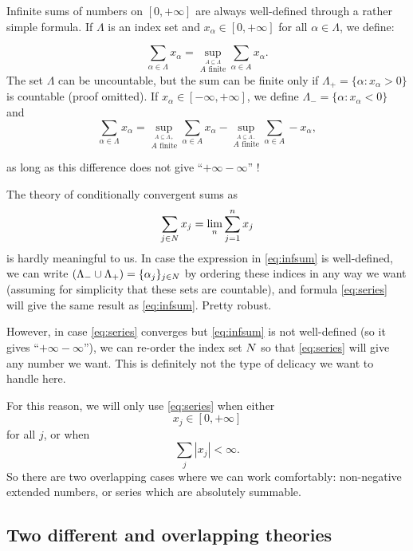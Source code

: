 \documentclass[
]{book}
\let\mathbb\relax %
\newcommand{\N}{\mathbb{N}}
\theoremstyle{definition}
\theoremstyle{definition}
\theoremstyle{definition}
\theoremstyle{definition}
\theoremstyle{remark}
\begin{document}
Infinite sums of numbers on \([0,+\infty]\) are always well-defined
through a rather simple formula. If \(\Lambda\) is an index set and
\(x_\alpha \in [0,+\infty]\) for all \(\alpha \in \Lambda\), we define:

\[\nonumber
\sum_{\alpha \in \Lambda} x_\alpha = \sup_{\stackrel{A \subseteq \Lambda}{A \text{ finite}}} \sum_{\alpha \in A} x_\alpha
.\] The set \(\Lambda\) can be uncountable, but the sum can be finite only
if \(\Lambda_+ = \{\alpha:x_\alpha>0\}\) is countable (proof omitted). If
\(x_\alpha \in [-\infty,+\infty]\), we define
\(\Lambda_- = \{\alpha:x_\alpha<0\}\) and
\begin{equation}
\label{eq:infsum}
\sum_{\alpha \in \Lambda} x_\alpha =
\sup_{\stackrel{A \subseteq \Lambda_+}{A \text{ finite}}} \sum_{\alpha \in A} x_\alpha
-
\sup_{\stackrel{A \subseteq \Lambda_-}{A \text{ finite}}} \sum_{\alpha \in A} -x_\alpha
,
\end{equation}

as long as this difference does not give ``\(+\infty-\infty\)'' !

The theory of conditionally convergent sums as
\begin{equation}
\sum_{j \in \N} x_j
=
\lim_n
\sum_{j = 1}^n x_j
\label{eq:series}
\end{equation}
is hardly meaningful to us. In case the expression
in \eqref{eq:infsum} is well-defined, we can write
\((\Lambda_- \cup \Lambda_+) = \{\alpha_j\}_{j\in\N}\) by ordering these
indices in any way we want (assuming for simplicity that these sets are
countable), and formula \eqref{eq:series} will give the same result
as \eqref{eq:infsum}. Pretty robust.

However, in case \eqref{eq:series} converges
but \eqref{eq:infsum} is not well-defined (so it gives
``\(+\infty-\infty\)''), we can re-order the index set \(\N\) so
that \eqref{eq:series} will give any number we want. This is definitely
not the type of delicacy we want to handle here.

For this reason, we will only
use \eqref{eq:series} when either \[x_j \in [0,+\infty]\] for all \(j\),
or when \[\sum_j |x_j| < \infty .\] So there are two overlapping cases
where we can work comfortably: non-negative extended numbers, or series
which are absolutely summable.

\hypertarget{two-different-and-overlapping-theories}{%
\subsection{Two different and overlapping theories}\label{two-different-and-overlapping-theories}}
\end{document}
